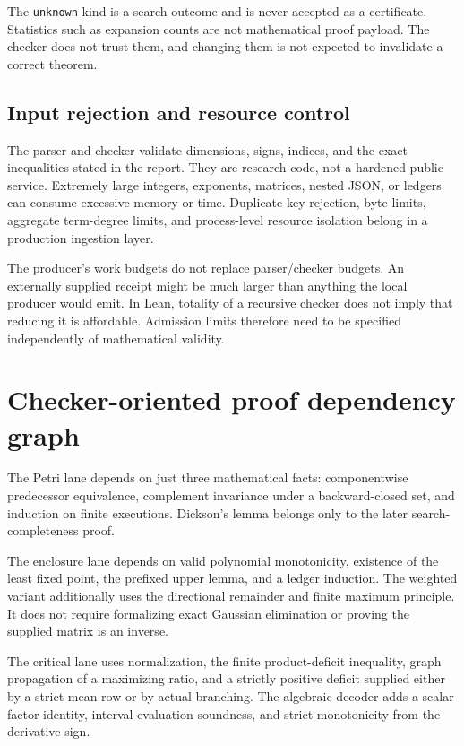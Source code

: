 \documentclass[11pt,a4paper]{article}
\theoremstyle{definition}\newtheorem{definition}[theorem]{Definition}
\theoremstyle{remark}\newtheorem{remark}[theorem]{Remark}
\newcommand{\code}[1]{\nolinkurl{#1}}
\begin{document}
The \code{unknown} kind is a search outcome and is never accepted as a certificate. Statistics such as expansion counts are not mathematical proof payload. The checker does not trust them, and changing them is not expected to invalidate a correct theorem.

\subsection{Input rejection and resource control}
The parser and checker validate dimensions, signs, indices, and the exact inequalities stated in the report. They are research code, not a hardened public service. Extremely large integers, exponents, matrices, nested JSON, or ledgers can consume excessive memory or time. Duplicate-key rejection, byte limits, aggregate term-degree limits, and process-level resource isolation belong in a production ingestion layer.

The producer's work budgets do not replace parser/checker budgets. An externally supplied receipt might be much larger than anything the local producer would emit. In Lean, totality of a recursive checker does not imply that reducing it is affordable. Admission limits therefore need to be specified independently of mathematical validity.

\section{Checker-oriented proof dependency graph}
The Petri lane depends on just three mathematical facts: componentwise predecessor equivalence, complement invariance under a backward-closed set, and induction on finite executions. Dickson's lemma belongs only to the later search-completeness proof.

The enclosure lane depends on valid polynomial monotonicity, existence of the least fixed point, the prefixed upper lemma, and a ledger induction. The weighted variant additionally uses the directional remainder and finite maximum principle. It does not require formalizing exact Gaussian elimination or proving the supplied matrix is an inverse.

The critical lane uses normalization, the finite product-deficit inequality, graph propagation of a maximizing ratio, and a strictly positive deficit supplied either by a strict mean row or by actual branching. The algebraic decoder adds a scalar factor identity, interval evaluation soundness, and strict monotonicity from the derivative sign.
\end{document}
